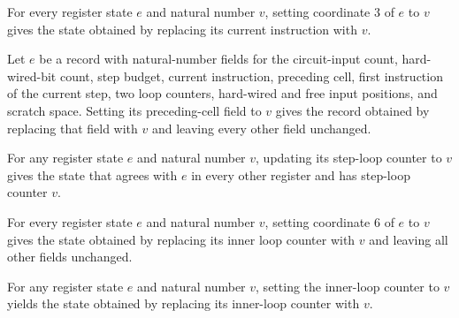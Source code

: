 \begin{theorem}
\label{Complexity.UTab.ER.set_i}
\leanok
{}
For every register state $e$ and natural number $v$, setting coordinate $3$ of $e$ to
$v$ gives the state obtained by replacing its current instruction with $v$.
\end{theorem}

\begin{theorem}
\label{Complexity.UTab.ER.set_q}
\leanok
{}
Let $e$ be a record with natural-number fields for the circuit-input count,
hard-wired-bit count, step budget, current instruction, preceding cell, first
instruction of the current step, two loop counters, hard-wired and free input positions,
and scratch space. Setting its preceding-cell field to $v$ gives the record obtained by
replacing that field with $v$ and leaving every other field unchanged.
\end{theorem}

\begin{theorem}
\label{Complexity.UTab.ER.set_lb}
\leanok
{}
For any register state $e$ and natural number $v$, updating its step-loop counter to $v$
gives the state that agrees with $e$ in every other register and has step-loop counter
$v$.
\end{theorem}

\begin{theorem}
\label{Complexity.UTab.ER.set_lt}
\leanok
{}
For every register state $e$ and natural number $v$, setting coordinate $6$ of $e$ to
$v$ gives the state obtained by replacing its inner loop counter with $v$ and leaving
all other fields unchanged.
\end{theorem}

\begin{theorem}
\label{Complexity.UTab.ER.set_ll}
\leanok
{}
For any register state $e$ and natural number $v$, setting the inner-loop counter to $v$
yields the state obtained by replacing its inner-loop counter with $v$.
\end{theorem}


